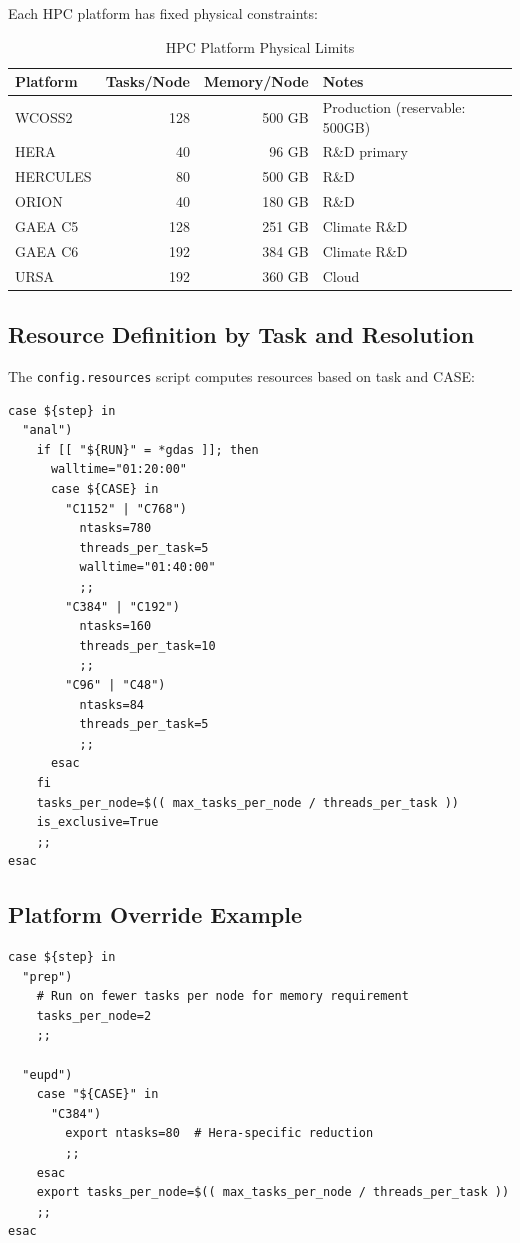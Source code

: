 \documentclass[11pt,letterpaper]{article}
\begin{document}
Each HPC platform has fixed physical constraints:

\begin{table}[H]
\centering
\caption{HPC Platform Physical Limits}
\label{tab:platform-limits}
\begin{tabular}{@{}lrrl@{}}
\toprule
\textbf{Platform} & \textbf{Tasks/Node} & \textbf{Memory/Node} & \textbf{Notes} \\
\midrule
WCOSS2 & 128 & 500 GB & Production (reservable: 500GB) \\
HERA & 40 & 96 GB & R\&D primary \\
HERCULES & 80 & 500 GB & R\&D \\
ORION & 40 & 180 GB & R\&D \\
GAEA C5 & 128 & 251 GB & Climate R\&D \\
GAEA C6 & 192 & 384 GB & Climate R\&D \\
URSA & 192 & 360 GB & Cloud \\
\bottomrule
\end{tabular}
\end{table}

\subsection{Resource Definition by Task and Resolution}

The \texttt{config.resources} script computes resources based on task and CASE:

\begin{lstlisting}[style=bashstyle, title=config.resources (Excerpt)]
case ${step} in
  "anal")
    if [[ "${RUN}" = *gdas ]]; then
      walltime="01:20:00"
      case ${CASE} in
        "C1152" | "C768")
          ntasks=780
          threads_per_task=5
          walltime="01:40:00"
          ;;
        "C384" | "C192")
          ntasks=160
          threads_per_task=10
          ;;
        "C96" | "C48")
          ntasks=84
          threads_per_task=5
          ;;
      esac
    fi
    tasks_per_node=$(( max_tasks_per_node / threads_per_task ))
    is_exclusive=True
    ;;
esac
\end{lstlisting}

\subsection{Platform Override Example}

\begin{lstlisting}[style=bashstyle, title=config.resources.HERA]
case ${step} in
  "prep")
    # Run on fewer tasks per node for memory requirement
    tasks_per_node=2
    ;;
    
  "eupd")
    case "${CASE}" in
      "C384")
        export ntasks=80  # Hera-specific reduction
        ;;
    esac
    export tasks_per_node=$(( max_tasks_per_node / threads_per_task ))
    ;;
esac
\end{lstlisting}
\end{document}
